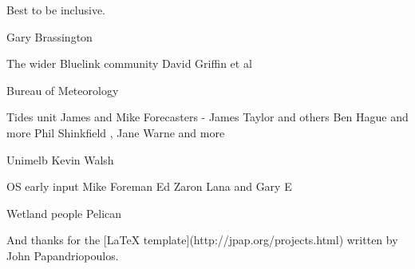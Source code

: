 
\begin{acknowledgements}

    Best to be inclusive.
    
    Gary Brassington
    
    The wider Bluelink community
    David Griffin et al
    
    Bureau of Meteorology
    
    Tides  unit
    James and Mike
    Forecasters - James Taylor and others
    Ben Hague and more
    Phil Shinkfield , Jane Warne and more
    
    Unimelb
    Kevin Walsh

    OS early input
    Mike Foreman
    Ed Zaron
    Lana and Gary E

    Wetland people
    Pelican

    And thanks for the [LaTeX template](http://jpap.org/projects.html) written by John Papandriopoulos.
\end{acknowledgements}
